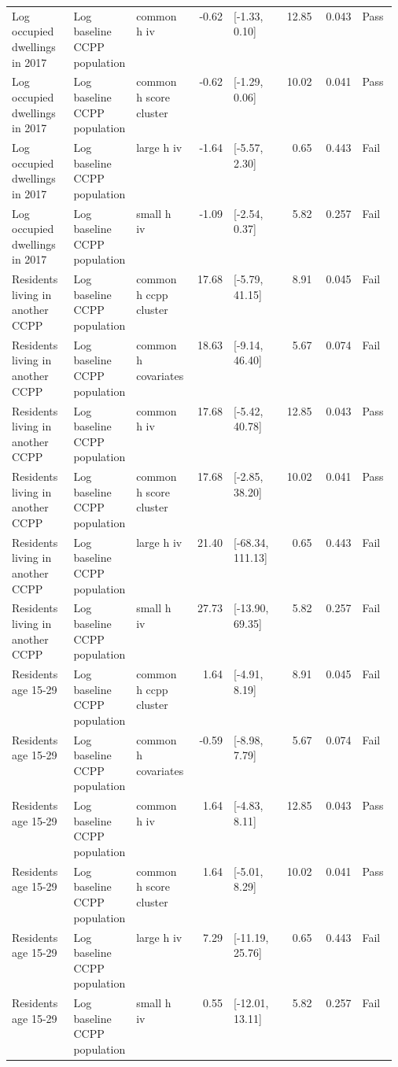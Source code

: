 \begin{longtable}{@{}p{0.16\linewidth}p{0.14\linewidth}p{0.14\linewidth}rp{0.13\linewidth}rrl@{}}
Log occupied dwellings in 2017 & Log baseline CCPP population & common h iv & -0.62 & [-1.33, 0.10] & 12.85 & 0.043 & Pass \\
Log occupied dwellings in 2017 & Log baseline CCPP population & common h score cluster & -0.62 & [-1.29, 0.06] & 10.02 & 0.041 & Pass \\
Log occupied dwellings in 2017 & Log baseline CCPP population & large h iv & -1.64 & [-5.57, 2.30] & 0.65 & 0.443 & Fail \\
Log occupied dwellings in 2017 & Log baseline CCPP population & small h iv & -1.09 & [-2.54, 0.37] & 5.82 & 0.257 & Fail \\
Residents living in another CCPP & Log baseline CCPP population & common h ccpp cluster & 17.68 & [-5.79, 41.15] & 8.91 & 0.045 & Fail \\
Residents living in another CCPP & Log baseline CCPP population & common h covariates & 18.63 & [-9.14, 46.40] & 5.67 & 0.074 & Fail \\
Residents living in another CCPP & Log baseline CCPP population & common h iv & 17.68 & [-5.42, 40.78] & 12.85 & 0.043 & Pass \\
Residents living in another CCPP & Log baseline CCPP population & common h score cluster & 17.68 & [-2.85, 38.20] & 10.02 & 0.041 & Pass \\
Residents living in another CCPP & Log baseline CCPP population & large h iv & 21.40 & [-68.34, 111.13] & 0.65 & 0.443 & Fail \\
Residents living in another CCPP & Log baseline CCPP population & small h iv & 27.73 & [-13.90, 69.35] & 5.82 & 0.257 & Fail \\
Residents age 15-29 & Log baseline CCPP population & common h ccpp cluster & 1.64 & [-4.91, 8.19] & 8.91 & 0.045 & Fail \\
Residents age 15-29 & Log baseline CCPP population & common h covariates & -0.59 & [-8.98, 7.79] & 5.67 & 0.074 & Fail \\
Residents age 15-29 & Log baseline CCPP population & common h iv & 1.64 & [-4.83, 8.11] & 12.85 & 0.043 & Pass \\
Residents age 15-29 & Log baseline CCPP population & common h score cluster & 1.64 & [-5.01, 8.29] & 10.02 & 0.041 & Pass \\
Residents age 15-29 & Log baseline CCPP population & large h iv & 7.29 & [-11.19, 25.76] & 0.65 & 0.443 & Fail \\
Residents age 15-29 & Log baseline CCPP population & small h iv & 0.55 & [-12.01, 13.11] & 5.82 & 0.257 & Fail \\

\end{longtable}
